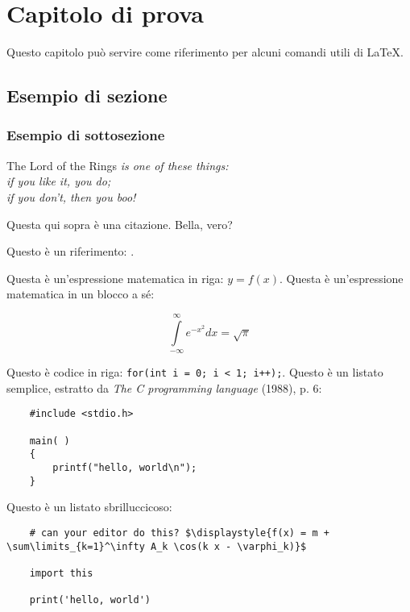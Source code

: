 \chapter{Capitolo di prova}

Questo capitolo può servire come riferimento per alcuni comandi utili di \LaTeX.

\section{Esempio di sezione}

\subsection{Esempio di sottosezione}

\begin{displayquote}[J. R. R. Tolkien]
    The Lord of the Rings \textit{is one of these things: \\ if you like it, you do; \\ if you don't, then you boo!}
\end{displayquote}

Questa qui sopra è una citazione. Bella, vero?

Questo è un riferimento: \cite{lamport1986latex}.

Questa è un'espressione matematica in riga: $y = f(x)$. Questa è un'espressione matematica in un blocco a sé:

\begin{equation}
    \int\limits_{-\infty}^\infty e^{-x^2}dx = \sqrt{\pi}
\end{equation}

Questo è codice in riga: \verb|for(int i = 0; i < 1; i++);|. Questo è un listato semplice, estratto da \textit{The C programming language} (1988), p. 6:

\begin{verbatim}
    #include <stdio.h>

    main( )
    {
        printf("hello, world\n");
    }
\end{verbatim}

Questo è un listato sbrilluccicoso:

\begin{verbatim}
    # can your editor do this? $\displaystyle{f(x) = m + \sum\limits_{k=1}^\infty A_k \cos(k x - \varphi_k)}$

    import this

    print('hello, world')
\end{verbatim}